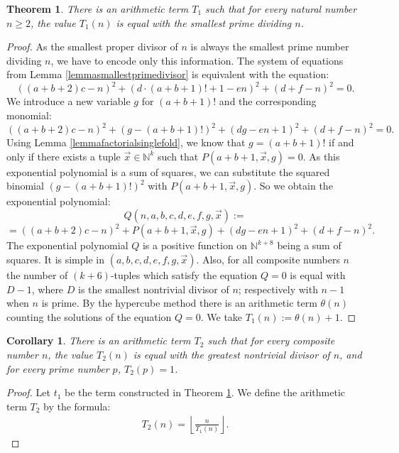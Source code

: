 \documentclass[10pt]{article}
\theoremstyle{plain}
\newtheorem{corollary}{Corollary}[section]
\newtheorem{theorem}{Theorem}[section]
\newcommand{\floor}[1]{\left\lfloor #1 \right\rfloor}
\begin{document}
\begin{theorem}\label{theoremsmallestprimedivisor}
    There is an arithmetic term $T_1$ such that for every natural number $n \geq 2$, the value $T_1(n)$ is equal with the smallest prime dividing $n$.
\end{theorem}

\begin{proof}
    As the smallest proper divisor of $n$ is always the smallest prime number dividing $n$, we have to encode only this information. The system of equations from Lemma \ref{lemmasmallestprimedivisor} is equivalent with the equation:
    $$((a+b+2) c - n)^2 + (d \cdot (a+b+1)! + 1 - en)^2 + (d + f - n)^2 = 0.$$
    We introduce a new variable $g$ for $(a+b+1)!$ and the corresponding monomial:
    $$((a+b+2) c - n)^2 + (g - (a+b+1)!)^2 + (dg  - en + 1)^2 + (d + f - n)^2 = 0.$$
    Using Lemma \ref{lemmafactorialsinglefold}, we know that $g = (a+b+1)!$ if and only if there exists a tuple $\vec x \in \mathbb N^k$ such that $P(a+b+1, \vec x, g) = 0 $. As this exponential polynomial is a sum of squares, we can substitute the squared binomial $(g - (a+b+1)!)^2$ with $P(a + b + 1, \vec x, g)$. So we obtain the exponential  polynomial:
    $$Q(n, a, b, c, d, e, f, g, \vec x) :=$$
    $$= ((a+b+2) c - n)^2 + P(a + b + 1, \vec x, g) + (dg  - en + 1)^2 + (d + f - n)^2.$$
    The exponential polynomial $Q$ is a positive function on $\mathbb N^{k+8}$ being a sum of squares. It is simple in $(a, b, c, d, e, f, g, \vec x)$. Also, for all composite numbers $n$ the number of $(k + 6)$-tuples which satisfy the equation $Q = 0$ is equal with $D-1$, where $D$ is the smallest nontrivial divisor of $n$; respectively with $n-1$ when $n$ is prime. By the hypercube method there is an arithmetic term $\theta(n)$ counting the solutions of the equation $Q=0$. We take $T_1(n):= \theta(n) + 1$.
\end{proof}

\begin{corollary}
    There is an arithmetic term $T_2$ such that for every composite number $n$, the value $T_2(n)$ is equal with the greatest nontrivial divisor of $n$, and for every prime number $p$, $T_2(p) = 1$.
\end{corollary}

\begin{proof}
    Let $t_1$ be the term constructed in Theorem \ref{theoremsmallestprimedivisor}. We define the arithmetic term $T_2$ by the formula:
    \begin{align*}
        T_2(n) = \floor{\frac{n}{T_1(n)}} .
    \end{align*}
\end{proof}
\end{document}
